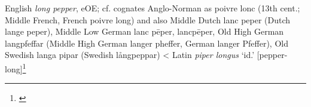 \begin{etymology}\label{ety:long_pepper}
English \textit{long pepper}, eOE; cf. cognates Anglo-Norman as poivre lonc (13th cent.; Middle French, French poivre long) and also Middle Dutch lanc peper (Dutch lange peper), Middle Low German lanc pēper, lancpēper, Old High German langpfeffar (Middle High German langer pheffer, German langer Pfeffer), Old Swedish langa pipar (Swedish långpeppar)
< Latin \textit{piper longus} `id.' [pepper-long]\footnote{\textcite[long pepper]{oed}}
\end{etymology}